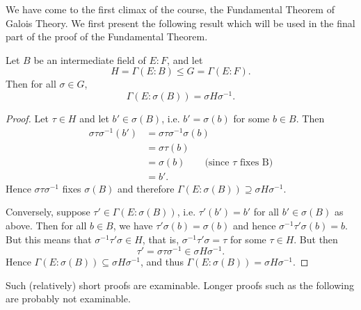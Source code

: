 We have come to the first climax of the course, the Fundamental Theorem of Galois Theory. We first present the following result which will be used in the final part of the proof of the Fundamental Theorem.
\begin{lemma}\label{lem:used-in-ftogt-iii}
	Let $B$ be an intermediate field of $E : F$, and let
	\[
		H = \Gamma(E : B) \leq G = \Gamma(E : F).
	\]
	Then for all $\sigma \in G$,
	\[
	\Gamma(E : \sigma(B)) = \sigma H \sigma^{-1}.
	\]
	\begin{proof}
		Let $\tau \in H$ and let $b' \in \sigma(B)$, i.e. $b' = \sigma(b)$ for some $b \in B$. Then
		\begin{align*}
			\sigma \tau \sigma^{-1}(b') &= \sigma \tau \sigma^{-1} \sigma(b) \\
				&= \sigma \tau(b) \\
				&= \sigma(b) \qquad \text{(since } \tau \text{ fixes B)} \\
				&= b'.
		\end{align*}
		Hence $\sigma \tau \sigma^{-1}$ fixes $\sigma(B)$ and therefore $\Gamma(E : \sigma(B)) \supseteq \sigma H \sigma^{-1}$.
		
		Conversely, suppose $\tau' \in \Gamma(E : \sigma(B))$, i.e. $\tau'(b') = b'$ for all $b' \in \sigma(B)$ as above. Then for all $b \in B$, we have $\tau' \sigma(b) = \sigma(b)$ and hence $\sigma^{-1} \tau' \sigma(b) = b$. But this means that $\sigma^{-1} \tau' \sigma \in H$, that is, $\sigma^{-1} \tau' \sigma = \tau$ for some $\tau \in H$. But then
		\[
			\tau' = \sigma \tau \sigma^{-1} \in \sigma H \sigma^{-1}.
		\]
		Hence $\Gamma(E : \sigma(B)) \subseteq \sigma H \sigma^{-1}$, and thus $\Gamma(E : \sigma(B)) = \sigma H \sigma^{-1}$.
	\end{proof}
\end{lemma}

\begin{remark}
	Such (relatively) short proofs are examinable. Longer proofs such as the following are probably not examinable.
\end{remark}

